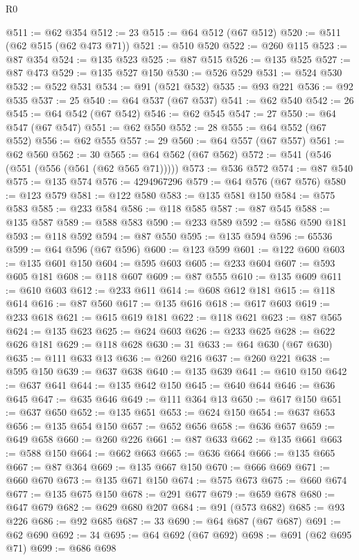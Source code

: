 \begin{lexlean}{R0}
\begin{coremodule}
@511 := @62 @354
@512 := 23
@515 := @64 @512 (@67 @512)
@520 := @511 (@62 @515 (@62 @473 @71))
@521 := @510 @520
@522 := @260 @115
@523 := @87 @354
@524 := @135 @523
@525 := @87 @515
@526 := @135 @525
@527 := @87 @473
@529 := @135 @527 @150
@530 := @526 @529
@531 := @524 @530
@532 := @522 @531
@534 := @91 (@521 @532)
@535 := @93 @221
@536 := @92 @535
@537 := 25
@540 := @64 @537 (@67 @537)
@541 := @62 @540
@542 := 26
@545 := @64 @542 (@67 @542)
@546 := @62 @545
@547 := 27
@550 := @64 @547 (@67 @547)
@551 := @62 @550
@552 := 28
@555 := @64 @552 (@67 @552)
@556 := @62 @555
@557 := 29
@560 := @64 @557 (@67 @557)
@561 := @62 @560
@562 := 30
@565 := @64 @562 (@67 @562)
@572 := @541 (@546 (@551 (@556 (@561 (@62 @565 @71)))))
@573 := @536 @572
@574 := @87 @540
@575 := @135 @574
@576 := 4294967296
@579 := @64 @576 (@67 @576)
@580 := @123 @579
@581 := @122 @580
@583 := @135 @581 @150
@584 := @575 @583
@585 := @233 @584
@586 := @118 @585
@587 := @87 @545
@588 := @135 @587
@589 := @588 @583
@590 := @233 @589
@592 := @586 @590 @181
@593 := @118 @592
@594 := @87 @550
@595 := @135 @594
@596 := 65536
@599 := @64 @596 (@67 @596)
@600 := @123 @599
@601 := @122 @600
@603 := @135 @601 @150
@604 := @595 @603
@605 := @233 @604
@607 := @593 @605 @181
@608 := @118 @607
@609 := @87 @555
@610 := @135 @609
@611 := @610 @603
@612 := @233 @611
@614 := @608 @612 @181
@615 := @118 @614
@616 := @87 @560
@617 := @135 @616
@618 := @617 @603
@619 := @233 @618
@621 := @615 @619 @181
@622 := @118 @621
@623 := @87 @565
@624 := @135 @623
@625 := @624 @603
@626 := @233 @625
@628 := @622 @626 @181
@629 := @118 @628
@630 := 31
@633 := @64 @630 (@67 @630)
@635 := @111 @633 @13
@636 := @260 @216
@637 := @260 @221
@638 := @595 @150
@639 := @637 @638
@640 := @135 @639
@641 := @610 @150
@642 := @637 @641
@644 := @135 @642 @150
@645 := @640 @644
@646 := @636 @645
@647 := @635 @646
@649 := @111 @364 @13
@650 := @617 @150
@651 := @637 @650
@652 := @135 @651
@653 := @624 @150
@654 := @637 @653
@656 := @135 @654 @150
@657 := @652 @656
@658 := @636 @657
@659 := @649 @658
@660 := @260 @226
@661 := @87 @633
@662 := @135 @661
@663 := @588 @150
@664 := @662 @663
@665 := @636 @664
@666 := @135 @665
@667 := @87 @364
@669 := @135 @667 @150
@670 := @666 @669
@671 := @660 @670
@673 := @135 @671 @150
@674 := @575 @673
@675 := @660 @674
@677 := @135 @675 @150
@678 := @291 @677
@679 := @659 @678
@680 := @647 @679
@682 := @629 @680 @207
@684 := @91 (@573 @682)
@685 := @93 @226
@686 := @92 @685
@687 := 33
@690 := @64 @687 (@67 @687)
@691 := @62 @690
@692 := 34
@695 := @64 @692 (@67 @692)
@698 := @691 (@62 @695 @71)
@699 := @686 @698

\end{coremodule}
\end{lexlean}
